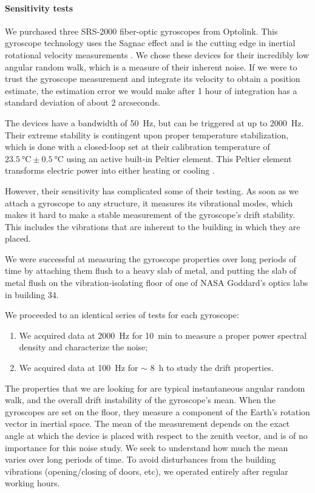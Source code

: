 \paragraph{Sensitivity tests}
We purchased three SRS-2000 fiber-optic gyroscopes from Optolink. This gyroscope technology uses the Sagnac effect and is the cutting edge in inertial rotational velocity measurements \citep[for a review of the state-of-the-art see, \textit{e.g.}][]{ElBadaoui:2014fr}. We chose these devices for their incredibly low angular random walk, which is a measure of their inherent noise. If we were to trust the gyroscope measurement and integrate its velocity to obtain a position estimate, the estimation error we would make after 1 hour of integration has a standard deviation of about 2 arcseconds.

The devices have a bandwidth of \SI{50}{\hertz}, but can be triggered at up to \SI{2000}{\hertz}. Their extreme stability is contingent upon proper temperature stabilization, which is done with a closed-loop set at their calibration temperature of $\SI{23.5}{\celsius}\pm\SI{0.5}{\celsius}$ using an active built-in Peltier element. This Peltier element transforms electric power into either heating or cooling \citep{Peltier:1834vu}.

However, their sensitivity has complicated some of their testing. As soon as we attach a gyroscope to any structure, it measures its vibrational modes, which makes it hard to make a stable measurement of the gyroscope's drift stability. This includes the vibrations that are inherent to the building in which they are placed.

We were successful at measuring the gyroscope properties over long periods of time by attaching them flush to a heavy slab of metal, and putting the slab of metal flush on the vibration-isolating floor of one of NASA Goddard's optics labs in building 34.

We proceeded to an identical series of tests for each gyroscope:
\begin{enumerate}
\item We acquired data at \SI{2000}{\hertz} for \SI{10}{\minute} to measure a proper power spectral density and characterize the noise;
\item We acquired data at \SI{100}{\hertz} for $\sim$ \SI{8}{\hour} to study the drift properties.
\end{enumerate}

The properties that we are looking for are typical instantaneous angular random walk, and the overall drift instability of the gyroscope's mean. When the gyroscopes are set on the floor, they measure a component of the Earth's rotation vector in inertial space. The mean of the measurement depends on the exact angle at which the device is placed with respect to the zenith vector, and is of no importance for this noise study. We seek to understand how much the mean varies over long periods of time. To avoid disturbances from the building vibrations (opening/closing of doors, etc), we operated entirely after regular working hours.

